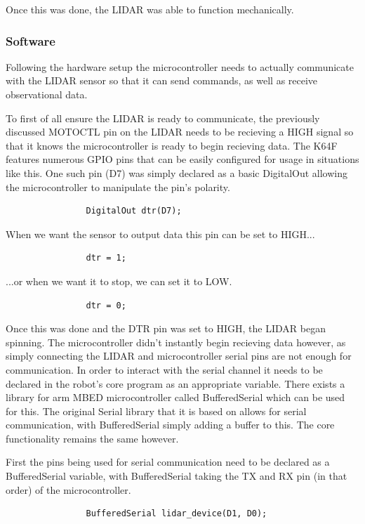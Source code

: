 				Once this was done, the LIDAR was able to function mechanically.
				
				\subsubsection{Software}
				Following the hardware setup the microcontroller needs to actually communicate with the LIDAR sensor so that it can send commands, as well as receive observational data. 
				
				To first of all ensure the LIDAR is ready to communicate, the previously discussed MOTOCTL pin on the LIDAR needs to be recieving a HIGH signal so that it knows the microcontroller is ready to begin recieving data. The K64F features numerous GPIO pins that can be easily configured for usage in situations like this. One such pin (D7) was simply declared as a basic DigitalOut allowing the microcontroller to manipulate the pin's polarity.
				
				\begin{lstlisting}
				DigitalOut dtr(D7);
				\end{lstlisting}
				
				When we want the sensor to output data this pin can be set to HIGH...
				\begin{lstlisting}
				dtr = 1;
				\end{lstlisting}
				
				...or when we want it to stop, we can set it to LOW.
				\begin{lstlisting}
				dtr = 0;
				\end{lstlisting}
				
				Once this was done and the DTR pin was set to HIGH, the LIDAR began spinning. The microcontroller didn't instantly begin recieving data however, as simply connecting the LIDAR and microcontroller serial pins are not enough for communication. In order to interact with the serial channel it needs to be declared in the robot's core program as an appropriate variable. There exists a library for arm MBED microcontroller called BufferedSerial which can be used for this. The original Serial library that it is based on allows for serial communication, with BufferedSerial simply adding a buffer to this. The core functionality remains the same however.
				
				First the pins being used for serial communication need to be declared as a BufferedSerial variable, with BufferedSerial taking the TX and RX pin (in that order) of the microcontroller. 
				\begin{lstlisting}
				BufferedSerial lidar_device(D1, D0);
				\end{lstlisting}
				

